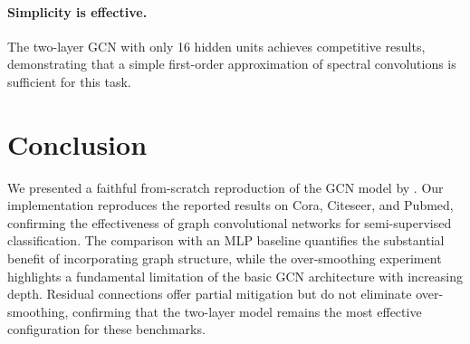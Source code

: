 \documentclass[10pt,twocolumn]{article}
\begin{document}
\paragraph{Simplicity is effective.} The two-layer GCN with only 16 hidden units achieves competitive results, demonstrating that a simple first-order approximation of spectral convolutions is sufficient for this task.

\section{Conclusion}
\label{sec:conclusion}

We presented a faithful from-scratch reproduction of the GCN model by \citet{kipf2017semi}.
Our implementation reproduces the reported results on Cora, Citeseer, and Pubmed, confirming the effectiveness of graph convolutional networks for semi-supervised classification.
The comparison with an MLP baseline quantifies the substantial benefit of incorporating graph structure, while the over-smoothing experiment highlights a fundamental limitation of the basic GCN architecture with increasing depth.
Residual connections offer partial mitigation but do not eliminate over-smoothing, confirming that the two-layer model remains the most effective configuration for these benchmarks.

\small


\end{document}
